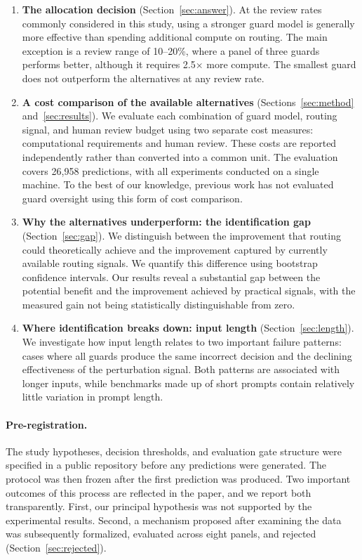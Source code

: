 \documentclass[11pt]{article}
\begin{document}
\begin{enumerate}
  \item \textbf{The allocation decision} (Section~\ref{sec:answer}). At the review rates commonly considered in this study, using a stronger guard model is generally more effective than spending additional compute on routing. The main exception is a review range of 10--20\%, where a panel of three guards performs better, although it requires 2.5$\times$ more compute. The smallest guard does not outperform the alternatives at any review rate.
  \item \textbf{A cost comparison of the available alternatives} (Sections~\ref{sec:method} and~\ref{sec:results}). We evaluate each combination of guard model, routing signal, and human review budget using two separate cost measures: computational requirements and human review. These costs are reported independently rather than converted into a common unit. The evaluation covers 26,958 predictions, with all experiments conducted on a single machine. To the best of our knowledge, previous work has not evaluated guard oversight using this form of cost comparison.
  \item \textbf{Why the alternatives underperform: the identification gap} (Section~\ref{sec:gap}). We distinguish between the improvement that routing could theoretically achieve and the improvement captured by currently available routing signals. We quantify this difference using bootstrap confidence intervals. Our results reveal a substantial gap between the potential benefit and the improvement achieved by practical signals, with the measured gain not being statistically distinguishable from zero.
  \item \textbf{Where identification breaks down: input length} (Section~\ref{sec:length}). We investigate how input length relates to two important failure patterns: cases where all guards produce the same incorrect decision and the declining effectiveness of the perturbation signal. Both patterns are associated with longer inputs, while benchmarks made up of short prompts contain relatively little variation in prompt length.
\end{enumerate}

\paragraph{Pre-registration.} The study hypotheses, decision thresholds, and evaluation gate structure were specified in a public repository before any predictions were generated. The protocol was then frozen after the first prediction was produced. Two important outcomes of this process are reflected in the paper, and we report both transparently. First, our principal hypothesis was not supported by the experimental results. Second, a mechanism proposed after examining the data was subsequently formalized, evaluated across eight panels, and rejected (Section~\ref{sec:rejected}).
\end{document}
